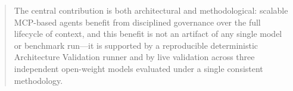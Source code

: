 \documentclass[jocse]{jocseart}
\begin{document}
\begin{abstract}
The central contribution is both architectural and methodological: scalable MCP-based agents benefit from disciplined governance over the full lifecycle of context, and this benefit is not an artifact of any single model or benchmark run---it is supported by a reproducible deterministic Architecture Validation runner and by live validation across three independent open-weight models evaluated under a single consistent methodology.
\end{abstract}



\maketitle




\balance




\end{document}
